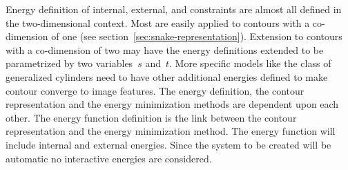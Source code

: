 Energy definition of internal, external, and constraints are almost
all defined in the two-dimensional context. Most are easily applied to
contours with a co-dimension of one (see
section~\ref{sec:snake-representation}). Extension to contours with a
co-dimension of two may have the energy definitions extended to be
parametrized by two variables~$s$ and~$t$. More specific models like
the class of generalized cylinders need to have other additional
energies defined to make contour converge to image features. The
energy definition, the contour representation and the energy
minimization methods are dependent upon each other. The energy
function definition is the link between the contour representation and
the energy minimization method. The energy function will include
internal and external energies. Since the system to be created will be
automatic no interactive energies are considered.


